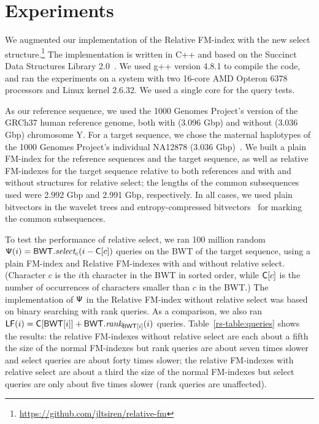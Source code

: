 \section{Experiments}
\label{rs-sec:experiments}

We augmented our implementation of the Relative FM-index with the new select structure.\footnote{\url{https://github.com/jltsiren/relative-fm}} The implementation is written in C++ and based on the Succinct Data Structures Library 2.0~\cite{GBMP14}. We used g++ version 4.8.1 to compile the code, and ran the experiments on a system with two 16-core AMD Opteron 6378 processors and Linux kernel 2.6.32. We used a single core for the query tests.

As our reference sequence, we used the 1000 Genomes Project's version of the GRCh37 human reference genome, both with (3.096 Gbp) and without (3.036 Gbp) chromosome Y. For a target sequence, we chose the maternal haplotypes of the 1000 Genomes Project's individual NA12878 (3.036 Gbp)~\cite{Rozowsky2011}. We built a plain FM-index for the reference sequences and the target sequence, as well as relative FM-indexes for the target sequence relative to both references and with and without structures for relative select; the lengths of the common subsequences used were 2.992 Gbp and 2.991 Gbp, respectively. In all cases, we used plain bitvectors in the wavelet trees and entropy-compressed bitvectors~\cite{RRR07} for marking the common subsequences.

To test the performance of relative select, we ran 100 million random $\mathsf{\Psi}(i) = \mathsf{BWT}.\textit{select}_{c}(i - \mathsf{C}[c])$ queries on the BWT of the target sequence, using a plain FM-index and Relative FM-indexes with and without relative select. (Character $c$ is the $i$th character in the BWT in sorted order, while $\mathsf{C}[c]$ is the number of occurrences of characters smaller than $c$ in the BWT.) The implementation of $\mathsf{\Psi}$ in the Relative FM-index without relative select was based on binary searching with rank queries. As a comparison, we also ran $\mathsf{LF}(i) = \mathsf{C}[\mathsf{BWT}[i]] + \mathsf{BWT}.\textit{rank}_{\mathsf{BWT}[i]}(i)$ queries. Table~\ref{rs-table:queries} shows the results: the relative FM-indexes without relative select are each about a fifth the size of the normal FM-indexes but rank queries are about seven times slower and select queries are about forty times slower; the relative FM-indexes with relative select are about a third the size of the normal FM-indexes but select queries are only about five times slower (rank queries are unaffected).

